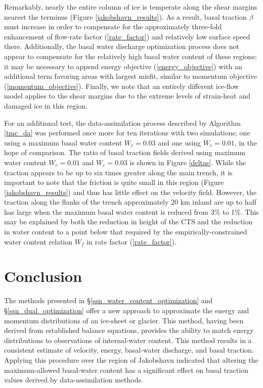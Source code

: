 Remarkably, nearly the entire column of ice is temperate along the shear margins nearest the terminus (Figure \ref{jakobshavn_results}).  As a result, basal traction $\beta$ must increase in order to compensate for the approximately three-fold enhancement of flow-rate factor (\ref{rate_factor}) and relatively low surface speed there.  Additionally, the basal water discharge optimization process does not appear to compensate for the relatively high basal water content of these regions; it may be necessary to append energy objective (\ref{energy_objective}) with an additional term favoring areas with largest misfit, similar to momentum objective (\ref{momentum_objective}).  Finally, we note that an entirely different ice-flow model applies to the shear margins due to the extreme levels of strain-heat and damaged ice in this region.

For an additional test, the data-assimilation process described by Algorithm \ref{tmc_da} was performed once more for ten iterations with two simulations; one using a maximum basal water content $W_c =0.03$ and one using $W_c = 0.01$, in the hope of comparison.  The ratio of basal traction fields derived using maximum water content $W_c = 0.01$ and $W_c = 0.03$ is shown in Figure \ref{deltas}.  While the traction appears to be up to six times greater along the main trench, it is important to note that the friction is quite small in this region (Figure \ref{jakobshavn_results}) and thus has little effect on the velocity field.  However, the traction along the flanks of the trench approximately 20 km inland are up to half has large when the maximum basal water content is reduced from 3\% to 1\%.  This may be explained by both the reduction in height of the CTS and the reduction in water content to a point below that required by the empirically-constrained water content relation $W_f$ in rate factor (\ref{rate_factor}).

\section{Conclusion}

The methods presented in \S \ref{ssn_water_content_optimization} and \S \ref{ssn_dual_optimization} offer a new approach to approximate the energy and momentum distributions of an ice-sheet or glacier.  This method, having been derived from established balance equations, provides the ability to match energy distributions to observations of internal-water content.  This method results in a consistent estimate of velocity, energy, basal-water discharge, and basal traction.  Applying this procedure over the region of Jakobshavn indicated that altering the maximum-allowed basal-water content has a significant effect on basal traction values derived by data-assimilation methods.

